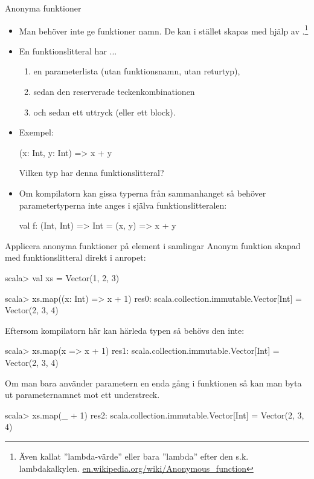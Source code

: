 

\begin{Slide}{Anonyma funktioner}
\begin{itemize}\SlideFontSmall
\item  Man behöver inte ge funktioner namn. De kan i stället skapas med hjälp av .\footnote{Även kallat ''lambda-värde'' eller bara ''lambda'' efter den s.k. lambdakalkylen. \href{https://en.wikipedia.org/wiki/Anonymous_function}{en.wikipedia.org/wiki/Anonymous\_function}}

\item En funktionslitteral har ...
\begin{enumerate}
\item en parameterlista (utan funktionsnamn, utan returtyp),
\item sedan den reserverade teckenkombinationen \code{=>}
\item och sedan ett uttryck (eller ett block).
\end{enumerate}
\pause
\item Exempel:
\begin{Code}[basicstyle=\ttfamily\SlideFontSize{9}{11}]
(x: Int, y: Int) => x + y
\end{Code}
Vilken typ har denna funktionslitteral? \pause \hfill{}
\pause
\item Om kompilatorn kan gissa typerna från sammanhanget så behöver parametertyperna inte anges i själva  funktionslitteralen:
\begin{Code}[basicstyle=\ttfamily\SlideFontSize{9}{11}]
val f: (Int, Int) => Int = (x, y) => x + y
\end{Code}
\end{itemize}
\end{Slide}


\begin{Slide}{Applicera anonyma funktioner på element i samlingar}\SlideFontSmall
Anonym funktion skapad med funktionslitteral direkt i anropet:
\begin{REPL}
scala> val xs = Vector(1, 2, 3)

scala> xs.map((x: Int) => x + 1)
res0: scala.collection.immutable.Vector[Int] = Vector(2, 3, 4)
\end{REPL}
\pause
Eftersom kompilatorn här kan härleda typen  så behövs den inte:
\begin{REPL}
scala> xs.map(x => x + 1)
res1: scala.collection.immutable.Vector[Int] = Vector(2, 3, 4)
\end{REPL}
\pause
Om man bara använder parametern en enda gång i funktionen så kan man byta ut parameternamnet mot ett understreck.
\begin{REPL}
scala> xs.map(_ + 1)
res2: scala.collection.immutable.Vector[Int] = Vector(2, 3, 4)
\end{REPL}
\end{Slide}



